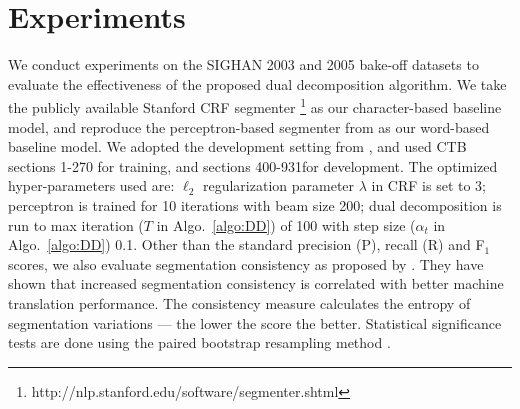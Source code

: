 \section{Experiments}


We conduct experiments  on the SIGHAN 2003 \cite{Sproat:2003:SIGHAN} and 2005 \cite{Emerson:2005:SIGHAN} bake-off datasets to evaluate the effectiveness of the proposed dual decomposition algorithm. We take the publicly available Stanford CRF segmenter \cite{Tseng:2005:SIGHAN}\footnote{http://nlp.stanford.edu/software/segmenter.shtml} as our character-based baseline model, and reproduce the perceptron-based segmenter from  as our word-based baseline model.
We adopted the development setting from \cite{Zhang:2007:ACL}, and used CTB sections 1-270 for training, and sections 400-931for development. The optimized hyper-parameters used are: $\ell_{2}$ regularization parameter $\lambda$ in CRF is set to $3$; perceptron is trained for 10 iterations with beam size 200; dual decomposition is run to max iteration ($T$ in Algo.~\ref{algo:DD}) of 100 with step size ($\alpha_t$ in Algo.~\ref{algo:DD}) 0.1. Other than the standard precision (P), recall (R) and F$_1$ scores, we also evaluate segmentation consistency as proposed by \cite{Chang:2008:ACL}. They have shown that increased segmentation consistency is correlated with better machine translation performance. The consistency measure calculates the entropy of segmentation variations --- the lower the score the better. Statistical significance tests are done using the paired bootstrap resampling method \cite{efron93bootstrap}.

